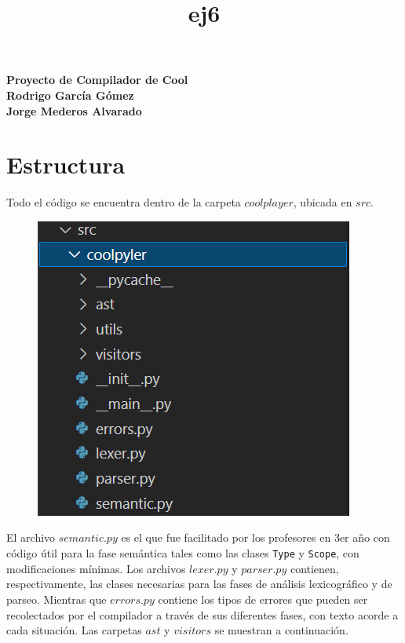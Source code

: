 \documentclass[a4paper,12pt]{article}
\def\code#1{\texttt{#1}}
\begin{document}
 

\title{ej6}

\begin{titlepage}
\centering
\vspace*{\fill}
\vspace*{0.5cm}
\huge\bfseries
Proyecto de Compilador de Cool\\
\vspace*{0.5cm}
\large Rodrigo García Gómez\\
Jorge Mederos Alvarado
\vspace*{\fill}
\end{titlepage}

\section*{Estructura}
Todo el código se encuentra dentro de la carpeta $coolplayer$, ubicada en $src$.

\begin{figure}[H]
\centering
\includegraphics[width=0.9\linewidth]{./1}
\caption{}
\label{fig:1}
\end{figure}

El archivo $semantic.py$ es el que fue facilitado por los profesores en 3er año con código útil para la fase semántica tales como las clases \code{Type} y \code{Scope}, con modificaciones mínimas. Los archivos $lexer.py$ y $parser.py$ contienen, respectivamente, las clases necesarias para las fases de análisis lexicográfico y de parseo. Mientras que $errors.py$ contiene los tipos de errores que pueden ser recolectados por el compilador a través de sus diferentes fases, con texto acorde a cada situación. Las carpetas $ast$ y $visitors$ se muestran a continuación.
\end{document}
